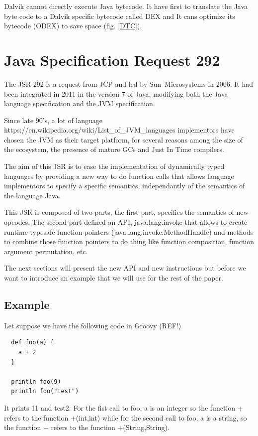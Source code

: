 \documentclass{sigplanconf}
\def \JCP{\ac{JCP}\xspace}
\def \SUN{\mbox{Sun Microsystems}\xspace}
\def \DALVIK{\mbox{Dalvik}\xspace}
\def \Jsr{\ac{JSR}\xspace}
\def \JSR{\Jsr 292\xspace}
\def \JVM{\ac{JVM}\xspace}
\def \DEX{\mbox{DEX}\xspace}
\begin{document}
      \DALVIK cannot directly execute Java bytecode.
      It have first to translate the Java byte code to a \DALVIK specific bytecode called \DEX
      and It cans optimize its bytecode (\mbox{ODEX}) to save space (fig. \ref{DTC}).

  \section{Java Specification Request 292}

    The \JSR is a request from \JCP and led by \SUN in 2006.
    It had been integrated in 2011 in the version 7 of Java,
    modifying both the Java language specification and the \JVM specification.

    Since late 90's, a lot of language
    https://en.wikipedia.org/wiki/List_of_JVM_languages
    implementors have chosen the JVM as their target platform,
    for several reasons among the size of the ecosystem,
    the presence of mature GCs and Just In Time compilers. 

    The aim of this \Jsr is to ease the implementation of dynamically typed languages
    by providing a new way to do function calls that allows language implementors
    to specify a specific semantics, independantly of the semantics of the language Java.
    
    This \Jsr is composed of two parts, the first part, specifies the semantics of
    new opcodes. The second part defined an API, java.lang.invoke that allows
    to create runtime typesafe function pointers (java.lang.invoke.MethodHandle) and
    methods to combine those function pointers to do thing like function composition,
    function argument permutation, etc.

    The next sections will present the new API and new instructions but before
    we want to introduce an example that we will use for the rest of the paper.

    \subsection{Example}
      Let suppose we have the following code in Groovy (REF!)
      
      {\tiny      
      \begin{verbatim}
  def foo(a) {
    a + 2
  }

  println foo(9)
  println foo("test")
      \end{verbatim}
      }

      It prints 11 and test2. For the fist call to foo, a is an integer so the function + refers
      to the function +(int,int) while for the second call to foo, a is a string, so the
      function + refers to the function +(String,String).
\end{document}
